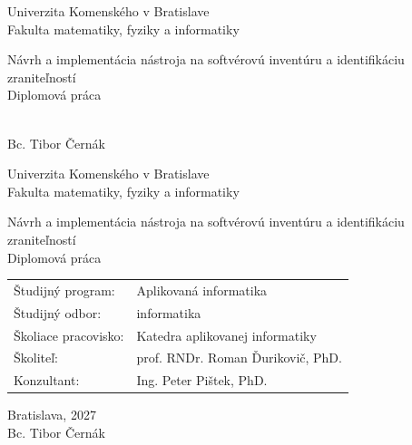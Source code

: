 \documentclass[12pt, oneside]{book}  %
\def\mfrok{2027}
\def\mfnazov{Návrh a implementácia nástroja na softvérovú inventúru a identifikáciu zraniteľností}
\def\mftyp{Diplomová práca}
\def\mfautor{Bc. Tibor Černák}
\def\mfskolitel{prof. RNDr. Roman Ďurikovič, PhD.}
\def\mfkonzultant{Ing. Peter Pištek, PhD.}
\def\mfmiesto{Bratislava, \mfrok}
\def\mfodbor{ informatika }
\def\program{ Aplikovaná informatika }
\def\mfpracovisko{ Katedra aplikovanej informatiky }
\begin{document}
\frontmatter
\pagestyle{empty}


\begin{center}
\sc\large
Univerzita Komenského v Bratislave\\
Fakulta matematiky, fyziky a informatiky

\vfill

{\LARGE\mfnazov}\\
\mftyp
\end{center}

\vfill

{\sc\large
\noindent \mfrok\\
\mfautor
}

\cleardoublepage



\noindent

\begin{center}
\sc
\large
Univerzita Komenského v Bratislave\\
Fakulta matematiky, fyziky a informatiky

\vfill

{\LARGE\mfnazov}\\
\mftyp
\end{center}

\vfill

\noindent
\begin{tabular}{ll}
Študijný program: & \program \\
Študijný odbor: & \mfodbor \\
Školiace pracovisko: & \mfpracovisko \\
Školiteľ: & \mfskolitel \\
Konzultant: & \mfkonzultant \\
\end{tabular}

\vfill


\noindent \mfmiesto\\
\mfautor

\cleardoublepage



\newpage
\setcounter{page}{3}

\end{document}

